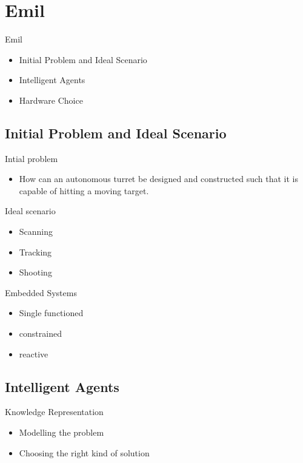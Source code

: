 \section{Emil}
\begin{frame}{Emil}
\begin{itemize}
  \item Initial Problem and Ideal Scenario
  \item Intelligent Agents
  \item Hardware Choice
\end{itemize}
\end{frame}

\subsection{Initial Problem and Ideal Scenario}
\begin{frame}{Intial problem}
\begin{itemize}
\item How can an autonomous turret be designed and constructed such
that it is capable of hitting a moving target.
\end{itemize}
\end{frame}

\begin{frame}{Ideal scenario}
\begin{itemize}
  \item Scanning
  \item Tracking
  \item Shooting
\end{itemize}
\end{frame}

\begin{frame}{Embedded Systems}
\begin{itemize}
  \item Single functioned
  \item constrained
  \item reactive
\end{itemize}
\end{frame}

\subsection{Intelligent Agents}
\begin{frame}{Knowledge Representation}
\begin{itemize}
  \item Modelling the problem
  \item Choosing the right kind of solution
\end{itemize}
\end{frame}

